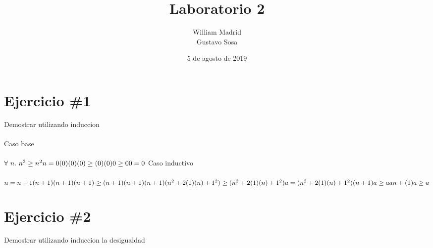 \documentclass{article}
\title{Laboratorio 2}
\author{William Madrid \\ Gustavo Sosa}
\date{5 de agosto de 2019}
\begin{document}
\maketitle

\section*{Ejercicio \#1}
Demostrar utilizando induccion\\
\\
Caso base \\
 \\
\begin{math}
\forall\ n.\ n^3\geq n^2\\
\\
n = 0 \\
(0) (0) (0) \geq (0) (0) \\
0 \geq 0 \\
0 = 0\\  
\\
\end{math}
Caso inductivo \\
\\
\begin{math}
n = n + 1\\
(n + 1) (n + 1) (n + 1) \geq (n + 1) (n + 1)\\
(n + 1) (n^2 + 2(1)(n) + 1^2) \geq (n^2 + 2(1)(n) + 1^2)\\
a = (n^2 + 2(1)(n) + 1^2)\\
(n + 1) a \geq a\\
an + (1)a \geq a\\

\end{math}
 
\section*{Ejercicio \#2}
Demostrar utilizando induccion la desigualdad\\
\end{document}
